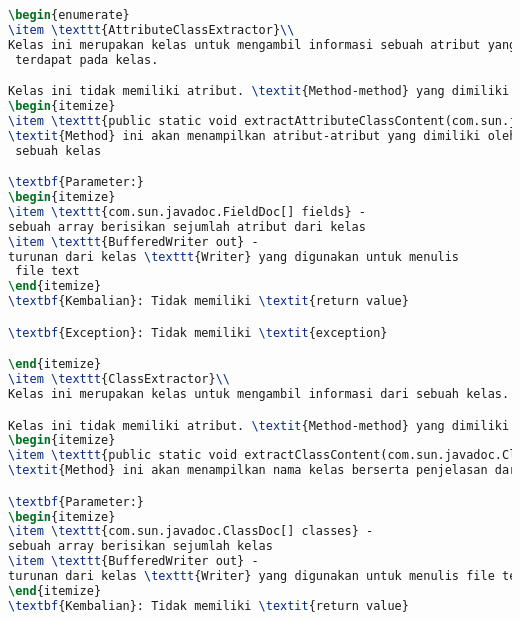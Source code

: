 \begin{lstlisting}[language=TeX, caption=Hasil Pengujian kode program perangkat punak]
\begin{enumerate}
\item \texttt{AttributeClassExtractor}\\ 
Kelas ini merupakan kelas untuk mengambil informasi sebuah atribut yang
 terdapat pada kelas.

Kelas ini tidak memiliki atribut. \textit{Method-method} yang dimiliki kelas ini adalah sebagai berikut.
\begin{itemize}
\item \texttt{public static void extractAttributeClassContent(com.sun.javadoc.FieldDoc[] fields, BufferedWriter out)}\\ 
\textit{Method} ini akan menampilkan atribut-atribut yang dimiliki oleh
 sebuah kelas

\textbf{Parameter:}
\begin{itemize}
\item \texttt{com.sun.javadoc.FieldDoc[] fields} - 
sebuah array berisikan sejumlah atribut dari kelas
\item \texttt{BufferedWriter out} - 
turunan dari kelas \texttt{Writer} yang digunakan untuk menulis
 file text
\end{itemize}
\textbf{Kembalian}: Tidak memiliki \textit{return value}

\textbf{Exception}: Tidak memiliki \textit{exception}

\end{itemize}
\item \texttt{ClassExtractor}\\ 
Kelas ini merupakan kelas untuk mengambil informasi dari sebuah kelas.

Kelas ini tidak memiliki atribut. \textit{Method-method} yang dimiliki kelas ini adalah sebagai berikut.
\begin{itemize}
\item \texttt{public static void extractClassContent(com.sun.javadoc.ClassDoc[] classes, BufferedWriter out)}\\ 
\textit{Method} ini akan menampilkan nama kelas berserta penjelasan dari sebuah kelas

\textbf{Parameter:}
\begin{itemize}
\item \texttt{com.sun.javadoc.ClassDoc[] classes} - 
sebuah array berisikan sejumlah kelas
\item \texttt{BufferedWriter out} - 
turunan dari kelas \texttt{Writer} yang digunakan untuk menulis file text
\end{itemize}
\textbf{Kembalian}: Tidak memiliki \textit{return value}


\end{lstlisting}
